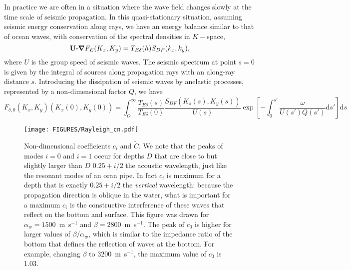In practice we are often in a situation where the wave field changes slowly at the time scale of seismic propagation. 
In this quasi-stationary situation, assuming seismic energy conservation along rays, 
we have an energy balance similar to that of ocean waves, with conservation of the 
spectral densities in $K-$space, 
\begin{equation}
\mathbf{U} \mbox{\boldmath $\cdot$} \mbox{\boldmath $\nabla$}{F_{E}}(K_x,K_y) =  T_{E \delta}(h) S_{DF}(k_x,k_y),
\end{equation}
where $U$ is the group speed of seismic waves.
The seismic spectrum at point $s=0$ is given by the integral 
of sources along propagation rays with an along-ray distance $s$. 
Introducing the dissipation of seismic waves by anelastic processes, represented by a non-dimensional factor $Q$, we have
\begin{equation}
F_{\delta,0}(K_x,K_y)(K_{x}(0),K_{y}(0)) = \int_O^\infty \frac{T_{E \delta}(s)}{T_{E \delta}(0)} \frac{S_{DF}(K_{s}(s),K_{y}(s))}{U(s)}
 \exp\left[-\int_0^{s'} \frac{\omega}{U(s')Q(s')} {\mathrm d}s'\right] \mathrm{d} s
\end{equation}
\begin{figure}[htb]
\centerline{\texttt{[image: FIGURES/Rayleigh\_cn.pdf]}}
  \caption{Non-dimensional coefficients $c_i$ and $\widetilde{C}$. 
  We note that the peaks of modes $i=0$ and $i=1$ occur for depths $D$ that are close to but slightly larger than   $D$ 
 $0.25+i/2$ the acoustic wavelength, just like the resonant modes of an oran pipe. In fact $c_i$ is maximum for a depth  that is 
 exactly $0.25+i/2$ the \emph{vertical} wavelength: because the propagation direction is oblique in the water, what is important for a maximum $c_i$ 
 is the constructive interference of these waves that reflect on the bottom and surface. This figure was drawn for  $\alpha_w=1500$~m~s$^{-1}$ 
 and $\beta=2800$~m~s$^{-1}$. 
The peak of $c_0$ is higher for larger values of  $\beta/\alpha_w$, which is similar to the impedance ratio of the bottom 
that defines the reflection of waves at the bottom. For example, changing $\beta$ to   $3200$~m~s$^{-1}$, the maximum value of $c_0$ is 1.03.}
\label{fig:sismo_coef}
\end{figure}

